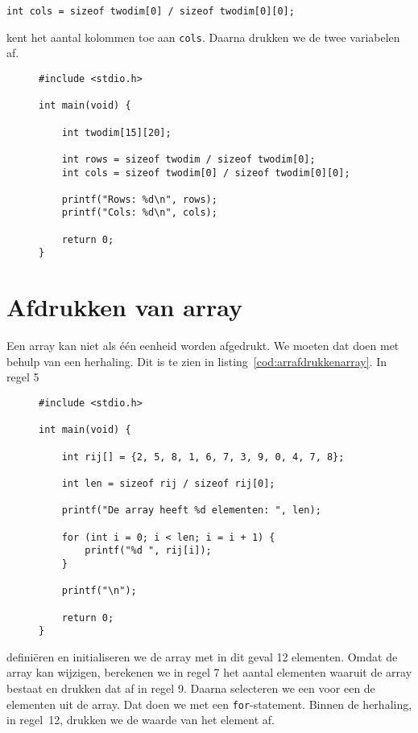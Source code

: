 \hspace*{1em}\texttt{int cols = sizeof twodim[0] / sizeof twodim[0][0];}

kent het aantal kolommen toe aan \texttt{cols}. Daarna drukken we de twee variabelen af.

\begin{figure}[!ht]
\begin{lstlisting}[caption=Bepalen van het aantal rijen en kolommen.,label=cod:arrsizetwodim]
#include <stdio.h>

int main(void) {

	int twodim[15][20];

	int rows = sizeof twodim / sizeof twodim[0];
	int cols = sizeof twodim[0] / sizeof twodim[0][0];

	printf("Rows: %d\n", rows);
	printf("Cols: %d\n", cols);

	return 0;
}
\end{lstlisting}
\end{figure}
\section{Afdrukken van array}
Een array kan niet als één eenheid worden afgedrukt. We moeten dat doen met behulp van een herhaling. Dit is te zien in listing~\ref{cod:arrafdrukkenarray}. In regel 5 %
\begin{figure}[!b]
\begin{lstlisting}[caption=Afdrukken van een array.,label=cod:arrafdrukkenarray]
#include <stdio.h>

int main(void) {

    int rij[] = {2, 5, 8, 1, 6, 7, 3, 9, 0, 4, 7, 8};

    int len = sizeof rij / sizeof rij[0];

    printf("De array heeft %d elementen: ", len);

    for (int i = 0; i < len; i = i + 1) {
        printf("%d ", rij[i]);
    }

    printf("\n");
    
    return 0;
}
\end{lstlisting}
\end{figure}
%
definiëren en initialiseren we de array met in dit geval 12 elementen. Omdat de array kan wijzigen, berekenen we in regel 7 het aantal elementen waaruit de array bestaat en drukken dat af in regel 9. Daarna selecteren we een voor een de elementen uit de array. Dat doen we met een \texttt{for}-statement. Binnen de herhaling, in regel~12, drukken we de waarde van het element af.


